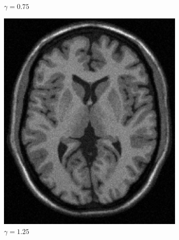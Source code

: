 \documentclass[letterpaper,12pt]{article}
\theoremstyle{plain}
\begin{document}
\begin{figure}[h]
\begin{subfigure}[h]{0.32\linewidth}
            \caption{$\gamma = 0.75$} 
         \end{subfigure}
         \begin{subfigure}[h]{0.32\linewidth}
            \centering
            \includegraphics[width=\textwidth]{Figuras/ImageA_exp_gamma=1.25.png}
            \caption{$\gamma = 1.25$} 
         \end{subfigure}
         \begin{subfigure}[h]{0.32\linewidth}
            \centering

\end{subfigure}
\end{figure}
\end{document}
